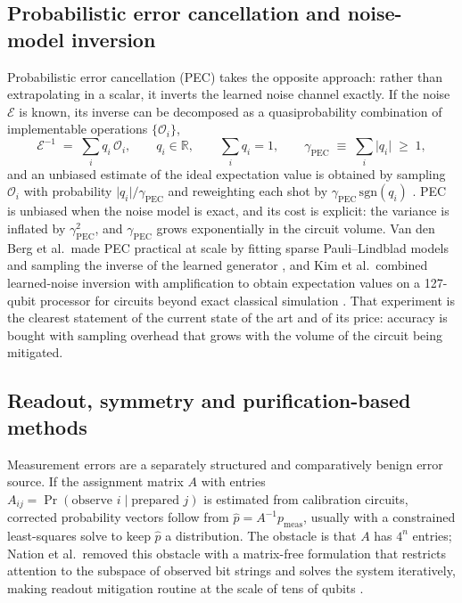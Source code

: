 \documentclass[Thesis.tex]{subfiles}
\begin{document}
\subsection{Probabilistic error cancellation and noise-model inversion}

Probabilistic error cancellation (PEC) takes the opposite approach: rather than
extrapolating in a scalar, it inverts the learned noise channel exactly. If the
noise $\mathcal{E}$ is known, its inverse can be decomposed as a
quasiprobability combination of implementable operations
$\{\mathcal{O}_{i}\}$,
\begin{equation}
  \mathcal{E}^{-1} \;=\; \sum_{i} q_{i}\,\mathcal{O}_{i},
  \qquad q_{i} \in \mathbb{R},
  \qquad \sum_{i} q_{i} = 1,
  \qquad \gamma_{\mathrm{PEC}} \;\equiv\; \sum_{i} \lvert q_{i}\rvert \;\ge\; 1,
  \label{eq2:pec}
\end{equation}
and an unbiased estimate of the ideal expectation value is obtained by sampling
$\mathcal{O}_{i}$ with probability $\lvert q_{i}\rvert/\gamma_{\mathrm{PEC}}$ and reweighting
each shot by $\gamma_{\mathrm{PEC}}\,\mathrm{sgn}(q_{i})$
\cite{temme2017error,endo2018practical}. PEC is unbiased when the noise model
is exact, and its cost is explicit: the variance is inflated by $\gamma_{\mathrm{PEC}}^{2}$,
and $\gamma_{\mathrm{PEC}}$ grows exponentially in the circuit volume. Van den Berg et al.\
made PEC practical at scale by fitting sparse Pauli--Lindblad models and
sampling the inverse of the learned generator
\cite{vandenberg2023probabilistic}, and Kim et al.\ combined learned-noise
inversion with amplification to obtain expectation values on a 127-qubit
processor for circuits beyond exact classical simulation
\cite{kim2023utility}. That experiment is the clearest statement of the
current state of the art and of its price: accuracy is bought with sampling
overhead that grows with the volume of the circuit being mitigated.

\subsection{Readout, symmetry and purification-based methods}

Measurement errors are a separately structured and comparatively benign error
source. If the assignment matrix $A$ with entries
$A_{ij} = \Pr(\text{observe }i \mid \text{prepared }j)$ is estimated from
calibration circuits, corrected probability vectors follow from
$\hat{p} = A^{-1} p_{\mathrm{meas}}$, usually with a constrained least-squares
solve to keep $\hat{p}$ a distribution. The obstacle is that $A$ has
$4^{n}$ entries; Nation et al.\ removed this obstacle with a
matrix-free formulation that restricts attention to the subspace of observed
bit strings and solves the system iteratively, making readout mitigation
routine at the scale of tens of qubits \cite{nation2021scalable}.
\end{document}
